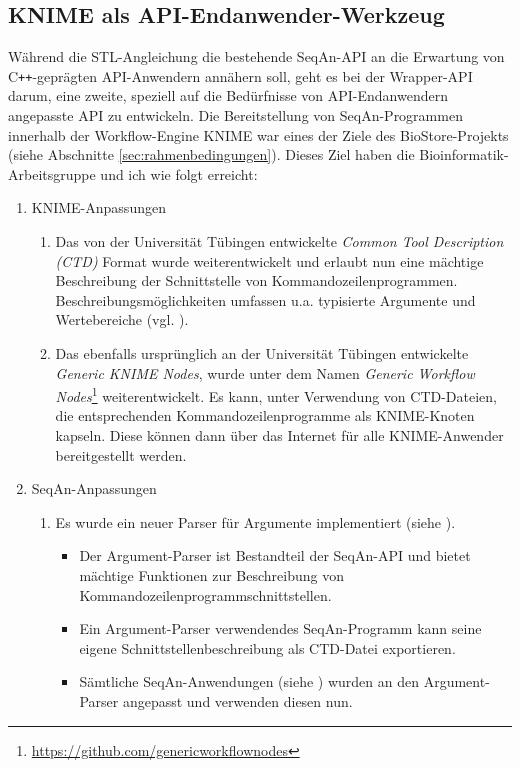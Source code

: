 \subsection{KNIME als API-Endanwender-Werkzeug}

Während die STL-Angleichung die bestehende SeqAn-API an die Erwartung von C\texttt{++}-geprägten API-Anwendern annähern soll, geht es bei der Wrapper-API darum, eine zweite, speziell auf die Bedürfnisse von API-Endanwendern angepasste API zu entwickeln. Die Bereitstellung von SeqAn-Programmen innerhalb der Workflow-Engine KNIME war eines der Ziele des BioStore-Projekts (siehe Abschnitte \ref{sec:rahmenbedingungen}). Dieses Ziel haben die Bioinformatik-Arbeitsgruppe und ich wie folgt erreicht:
\begin{enumerate}
  \item KNIME-Anpassungen
  \begin{enumerate}
    \item[1.] Das von der Universität Tübingen entwickelte \textit{Common Tool Description (CTD)} Format wurde weiterentwickelt und erlaubt nun eine mächtige Beschreibung der Schnittstelle von Kommandozeilenprogrammen. Beschreibungsmöglichkeiten umfassen u.a. typisierte Argumente und Wertebereiche (vgl. ).
    \item[2.] Das ebenfalls ursprünglich an der Universität Tübingen entwickelte \textit{Generic KNIME Nodes}, wurde unter dem Namen \textit{Generic Workflow Nodes}\footnote{\url{https://github.com/genericworkflownodes}} weiterentwickelt. Es kann, unter Verwendung von CTD-Dateien, die entsprechenden Kommandozeilenprogramme als KNIME-Knoten kapseln. Diese können dann über das Internet für alle KNIME-Anwender bereitgestellt werden.
  \end{enumerate}
  \item SeqAn-Anpassungen
  \begin{enumerate}
    \item[1.] Es wurde ein neuer Parser für Argumente implementiert (siehe ).
    \begin{itemize}
      \item Der Argument-Parser ist Bestandteil der SeqAn-API und bietet mächtige Funktionen zur Beschreibung von Kommandozeilenprogrammschnittstellen.
      \item Ein Argument-Parser verwendendes SeqAn-Programm kann seine eigene Schnittstellenbeschreibung als CTD-Datei exportieren.
      \item Sämtliche SeqAn-Anwendungen (siehe ) wurden an den Argument-Parser angepasst und verwenden diesen nun.

\end{itemize}
\end{enumerate}
\end{enumerate}
